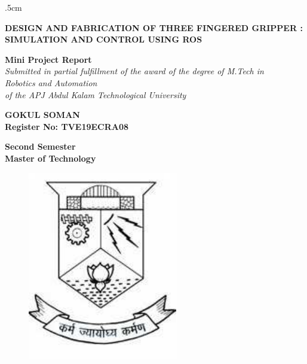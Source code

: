 \documentclass[a4paper,12pt,one side]{report}%
\begin{document}
\thispagestyle{empty}

\oddsidemargin 1.48cm
\evensidemargin .5cm
\begin{center}

{\Large \bf DESIGN AND FABRICATION OF THREE FINGERED GRIPPER : SIMULATION AND CONTROL USING ROS \\}

\vspace*{0.65cm}
{\large \textbf {Mini Project Report}}\\
{\normalsize \it Submitted in partial fulfillment of the award of the degree of M.Tech in\\  Robotics and Automation\\ of the APJ Abdul Kalam Technological University
}





\vspace*{.5cm}

{\bf GOKUL SOMAN\\
{\bf Register No: TVE19ECRA08}
\vspace*{0.75cm}

\vspace*{.5cm}

{\bf Second Semester}\\
{\bf Master of Technology}
\vspace*{0.75cm}


\begin{figure}[hbt]
\centering
\centerline{\includegraphics[scale=1]{ccc/cet_emblem.pdf}}
\end{figure}
\vspace*{0.75cm}


}
\end{center}
\end{document}
